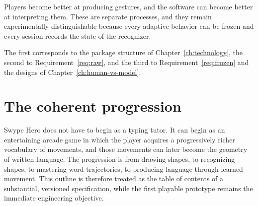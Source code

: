 \begin{principle}\label{pr:A3}
Players become better at producing gestures, and the software can become better at interpreting them. These are separate processes, and they remain experimentally distinguishable because every adaptive behavior can be frozen and every session records the state of the recognizer.
\end{principle}

The first corresponds to the package structure of Chapter~\ref{ch:technology}, the second to Requirement~\ref{req:raw}, and the third to Requirement~\ref{req:frozen} and the designs of Chapter~\ref{ch:human-vs-model}.

\section{The coherent progression}

Swype Hero does not have to begin as a typing tutor. It can begin as an entertaining arcade game in which the player acquires a progressively richer vocabulary of movements, and those movements can later become the geometry of written language. The progression is from drawing shapes, to recognizing shapes, to mastering word trajectories, to producing language through learned movement. This outline is therefore treated as the table of contents of a substantial, versioned specification, while the first playable prototype remains the immediate engineering objective.
